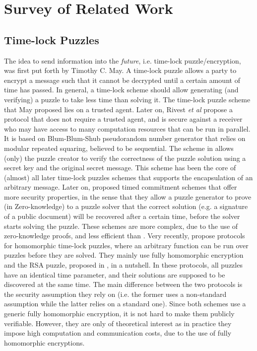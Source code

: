 \section{Survey of Related Work}\label{Survey-of-Related-Work}
\subsection{Time-lock Puzzles}

The idea to send information into the \emph{future}, i.e.
time-lock puzzle/encryption, was first put forth by Timothy C. May. A time-lock puzzle allows a party to encrypt a message such that it cannot be decrypted  until a certain amount of time has passed. In general,  a  time-lock scheme should allow    generating (and verifying) a puzzle to take less time than solving it. The time-lock puzzle scheme that May proposed lies on a trusted agent. Later on, Rivest \textit{et al} \cite{Rivest:1996:TPT:888615} propose a protocol that does not require a trusted agent, and is secure against a receiver
who may have access to many  computation resources that can be run in parallel. It is based on Blum-Blum-Shub pseudorandom number generator that relies on modular repeated squaring, believed to be sequential. The scheme in \cite{Rivest:1996:TPT:888615} allows (only) the puzzle creator to  verify the correctness of the puzzle solution using a secret key and the original secret message.  This scheme has been the core of (almost) all later time-lock puzzles schemes that supports the encapsulation of an arbitrary message. Later on, \cite{BonehN00,DBLP:conf/fc/GarayJ02} proposed timed commitment schemes that offer more security properties, in the sense that they   allow a puzzle generator to prove (in Zero-knowledge) to a puzzle solver that the correct solution (e.g. a signature of a public document) will be recovered after a certain time, before the solver starts solving the puzzle. These schemes are more complex, due to the use of zero-knowledge proofs, and less efficient than \cite{Rivest:1996:TPT:888615}.    Very recently, \cite{MalavoltaT19,BrakerskiDGM19}  propose protocols for homomorphic time-lock puzzles, where an arbitrary function can be run over puzzles before they are solved. They mainly use  fully homomorphic encryption and   the RSA puzzle, proposed in \cite{BrakerskiDGM19}, in a nutshell. In these protocols, all puzzles have an identical time parameter, and their solutions are supposed to be discovered at the same time. The main difference between the two protocols is the security assumption they rely on (i.e. the former uses a non-standard assumption while the latter relies on a standard one). Since both schemes use a generic fully homomorphic encryption, it is not hard to make them publicly verifiable. However, they  are only of theoretical interest as in practice they impose  high computation and communication costs, due to the use of fully homomorphic encryptions.


